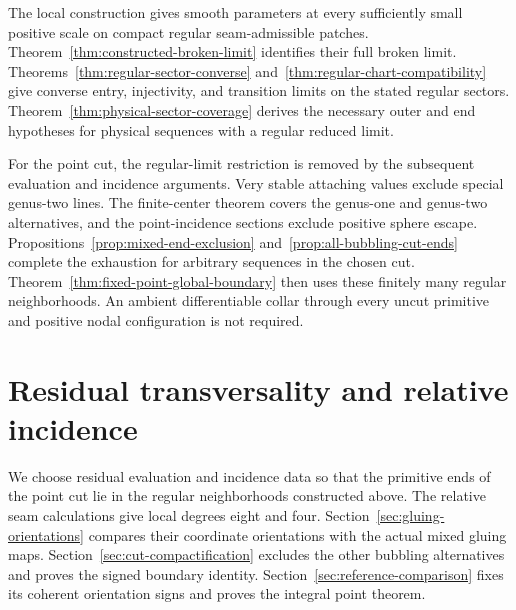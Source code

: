 \documentclass[11pt]{amsart}
\theoremstyle{definition}
\theoremstyle{remark}
\theoremstyle{plain}
\begin{document}
The local construction gives smooth parameters at every
sufficiently small positive scale on compact regular
seam-admissible patches.
Theorem~\ref{thm:constructed-broken-limit} identifies
their full broken limit.
Theorems~\ref{thm:regular-sector-converse}
and~\ref{thm:regular-chart-compatibility}
give converse entry, injectivity, and transition limits
on the stated regular sectors.
Theorem~\ref{thm:physical-sector-coverage} derives
the necessary outer and end hypotheses for physical
sequences with a regular reduced limit.

For the point cut, the regular-limit restriction is
removed by the subsequent evaluation and incidence
arguments. Very stable attaching values exclude
special genus-two lines. The finite-center theorem
covers the genus-one and genus-two alternatives,
and the point-incidence sections exclude positive
sphere escape. Propositions~\ref{prop:mixed-end-exclusion}
and~\ref{prop:all-bubbling-cut-ends} complete the
exhaustion for arbitrary sequences in the chosen cut.
Theorem~\ref{thm:fixed-point-global-boundary}
then uses these finitely many regular neighborhoods.
An ambient differentiable collar through every
uncut primitive and positive nodal configuration
is not required.

\section{Residual transversality and relative incidence}
\label{sec:boundary-formula}

We choose residual evaluation and incidence data so that the
primitive ends of the point cut lie in the regular neighborhoods
constructed above. The relative seam calculations give local
degrees eight and four. Section~\ref{sec:gluing-orientations}
compares their coordinate orientations with the actual mixed
gluing maps. Section~\ref{sec:cut-compactification} excludes
the other bubbling alternatives and proves the signed boundary
identity. Section~\ref{sec:reference-comparison} fixes its
coherent orientation signs and proves the integral point theorem.
\end{document}
